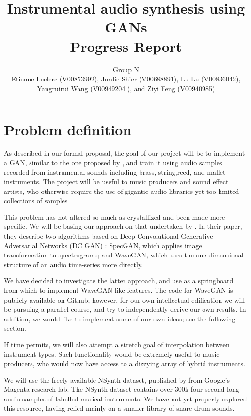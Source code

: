 \documentclass{article} %
\title{Instrumental audio synthesis using GANs \\ Progress Report}
\author{Group N\\Etienne Leclerc (V00853992), Jordie Shier (V00688891), Lu Lu (V00836042),\\ Yangruirui Wang (V00949204
), and Ziyi Feng (V00940985)}
\begin{document}
\maketitle

\section{Problem definition}
As described in our formal proposal, the goal of our project will be to implement a GAN, similar to the one proposed by \citet{donahue2018adversarial}, and train it using audio samples recorded from instrumental sounds including brass, string,reed, and mallet instruments. The project will be useful to music producers and sound effect artists, who otherwise require the use of gigantic audio libraries yet too-limited collections of samples


This problem has not altered so much as crystallized and been made more specific. We will be basing our approach on that undertaken by  \citet{donahue2018adversarial}. In their paper, they describe two algorithms based on Deep Convolutional Generative Adversarial Networks (DC GAN) \citet{gao2018deep}: SpecGAN, which applies image transformation to spectrograms; and WaveGAN, which uses the one-dimensional structure of an audio time-series more directly.


We have decided to investigate the latter approach, and use \citet{donahue2018adversarial}as a springboard from which to implement WaveGAN-like features. The code for WaveGAN is publicly available on Github; however, for our own intellectual edification we will be pursuing a parallel course, and try to independently derive our own results. In addition, we would like to implement some of our own ideas; see the following section.

If time permits, we will also attempt a stretch goal of interpolation between instrument types. Such functionality would be extremely useful to music producers, who would now have access to a dizzying array of hybrid instruments.


We will use the freely available NSynth dataset, published by \citet{engel2018gansynth} from Google’s Magenta research lab. The NSynth dataset contains over 300k four second long audio samples of labelled musical instruments. We have not yet properly explored this resource, having relied mainly on a smaller library of snare drum sounds.
\end{document}
